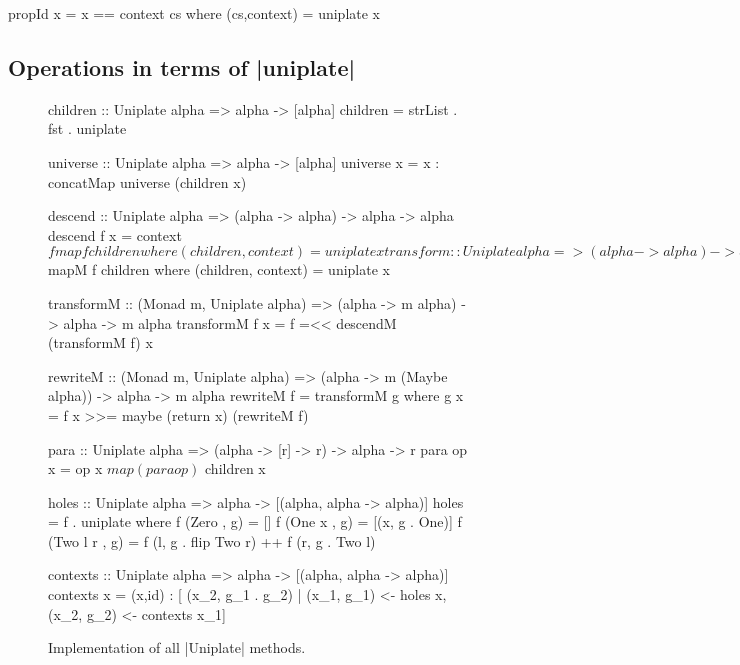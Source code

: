 \begin{code}
propId x = x == context cs
    where (cs,context) = uniplate x
\end{code}

\subsection{Operations in terms of |uniplate|}
\label{secU:using_replacechildren}

\begin{figure}
\begin{code}
children :: Uniplate alpha => alpha -> [alpha]
children = strList . fst . uniplate

universe :: Uniplate alpha => alpha -> [alpha]
universe x = x : concatMap universe (children x)

descend :: Uniplate alpha => (alpha -> alpha) -> alpha -> alpha
descend f x = context $ fmap f children
    where (children, context) = uniplate x

transform :: Uniplate alpha => (alpha -> alpha) -> alpha -> alpha
transform f = f . descend (transform f)

rewrite :: Uniplate alpha => (alpha -> Maybe alpha) -> alpha -> alpha
rewrite f = transform g
    where g x = maybe x (rewrite f) (f x)

descendM :: (Monad m, Uniplate alpha) => (alpha -> m alpha) -> alpha -> m alpha
descendM f x = liftM context $ mapM f children
    where (children, context) = uniplate x

transformM :: (Monad m, Uniplate alpha) => (alpha -> m alpha) -> alpha -> m alpha
transformM f x = f =<< descendM (transformM f) x

rewriteM :: (Monad m, Uniplate alpha) => (alpha -> m (Maybe alpha)) -> alpha -> m alpha
rewriteM f = transformM g
    where g x = f x >>= maybe (return x) (rewriteM f)

para :: Uniplate alpha => (alpha -> [r] -> r) -> alpha -> r
para op x = op x $ map (para op) $ children x

holes :: Uniplate alpha => alpha -> [(alpha, alpha -> alpha)]
holes = f . uniplate
  where  f (Zero     , g) = []
         f (One x    , g) = [(x, g . One)]
         f (Two l r  , g) = f (l, g . flip Two r) ++ f (r, g . Two l)

contexts :: Uniplate alpha => alpha -> [(alpha, alpha -> alpha)]
contexts x  =  (x,id) : [ (x_2, g_1 . g_2)
            |  (x_1, g_1) <- holes x, (x_2, g_2) <- contexts x_1]
\end{code}
\caption{Implementation of all |Uniplate| methods.}
\label{fig:Uimplements}
\end{figure}

